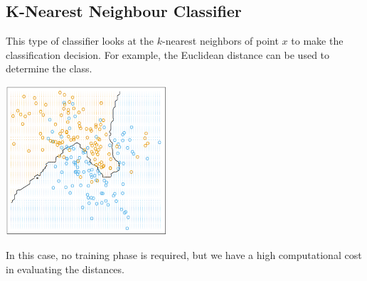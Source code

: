 \documentclass{article}
\begin{document}
\subsection{K-Nearest Neighbour Classifier}
This type of classifier looks at the $k$-nearest neighbors of point $x$ to make the classification decision. For example, the Euclidean distance can be used to determine the class.

\begin{center}
	\includegraphics[width=6cm]{nearest_neighbors.png}
\end{center}
In this case, no training phase is required, but we have a high computational cost in evaluating the distances.
\end{document}
